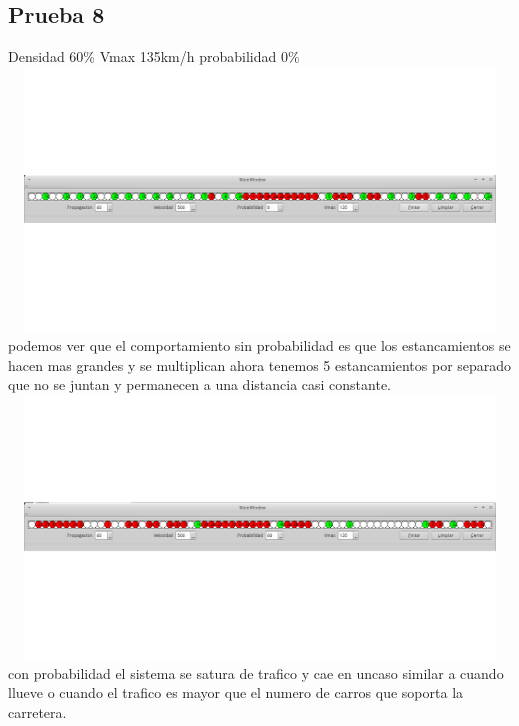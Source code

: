 \documentclass[a4paper,10pt]{article}
\begin{document}
\subsection{Prueba 8}
Densidad 60\% Vmax 135km/h probabilidad 0\%
\\
\includegraphics[width=15cm, height=7cm]{28}
\\
podemos ver que el comportamiento sin probabilidad es que los estancamientos se hacen mas grandes y se multiplican ahora tenemos 5 estancamientos por separado que no se juntan y permanecen a una distancia casi constante.
\includegraphics[width=15cm, height=7cm]{29}
\\
con probabilidad el sistema se satura de trafico y cae en uncaso similar a cuando llueve o cuando el trafico es mayor que el numero de carros que soporta la carretera.
\end{document}
